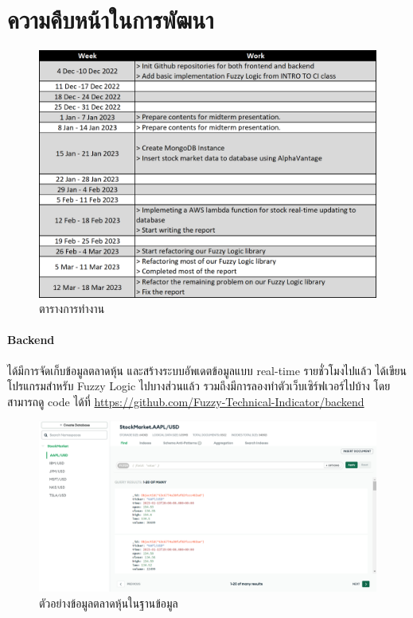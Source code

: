 \chapter{ความคืบหน้าในการพัฒนา}
\begin{figure}[ht]
    \centering
    \includegraphics[width=\textwidth]{images/works.png}
    \caption{ตารางการทำงาน}
\end{figure}
\subsubsection{Backend}
ได้มีการจัดเก็บข้อมูลตลาดหุ้น และสร้างระบบอัพเดตข้อมูลแบบ real-time รายชั่วโมงไปแล้ว ได้เขียนโปรแกรมสำหรับ Fuzzy Logic ไปบางส่วนแล้ว
รวมถึงมีการลองทำตัวเว็บเซิร์ฟเวอร์ไปบ้าง โดยสามารถดู code ได้ที่ \url{https://github.com/Fuzzy-Technical-Indicator/backend}

\begin{figure}[ht]
    \centering
    \includegraphics[width=\textwidth]{images/db_example.png}
    \caption{ตัวอย่างข้อมูลตลาดหุ้นในฐานข้อมูล}
\end{figure}
\pagebreak

